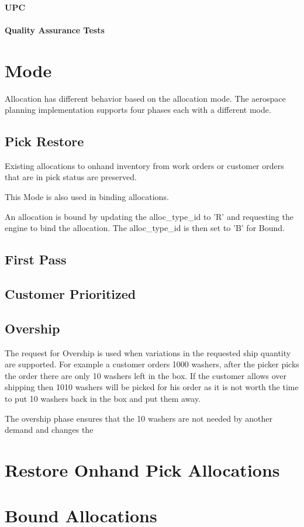 \documentclass[a4paper,10pt]{book}
\begin{document}
\paragraph{UPC}
\paragraph{Quality Assurance Tests}
\section{Mode}
Allocation has different behavior based on the allocation mode.  The aerospace planning implementation supports 
four phases each with a different mode.
\subsection{Pick Restore}
Existing allocations to onhand inventory from work orders or customer orders that are in pick status are preserved.

This Mode is also used in binding allocations.

An allocation is bound by updating the alloc\_type\_id to 'R' and requesting the engine to bind the allocation.  
The alloc\_type\_id is then set to 'B' for Bound.
\subsection{First Pass}
\subsection{Customer Prioritized}
\subsection{Overship}
The request for Overship is used when variations in the requested ship quantity are supported.  For example a customer orders
1000 washers, after the picker picks the order there are only 10 washers left in the box.  If the customer allows over shipping then 1010 
washers will be picked for his order as it is not worth the time to put 10 washers back in the box and put them away.

The overship phase ensures that the 10 washers are not needed by another demand and changes the 
\section{Restore Onhand Pick Allocations}

\section{Bound Allocations}
\end{document}

